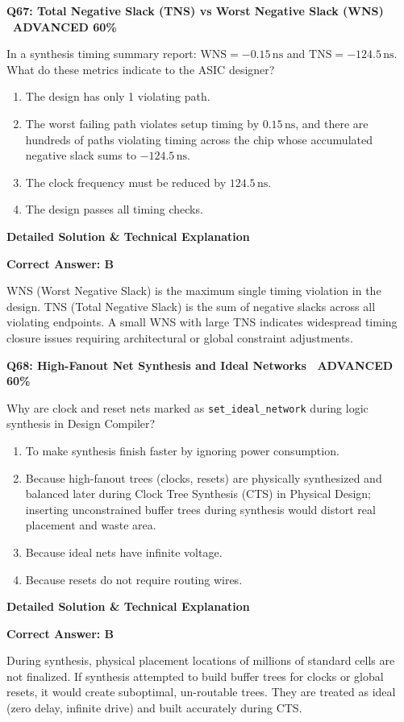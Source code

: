 \documentclass[11pt,a4paper]{article}
\newcommand{\badgeadv}{{\color{white}\colorbox{advred}{\bfseries\sffamily\tiny\ ADVANCED 60\%\ }}}
\newenvironment{qbox}[2]{%
  \begin{mdframed}[style=qstyle]%
  {\bfseries\sffamily\color{primaryblue}#1 \hfill #2}\par\vspace{2pt}%
}{%
  \end{mdframed}%
}
\newenvironment{ansbox}{%
  \begin{mdframed}[style=ansstyle]%
  {\bfseries\sffamily\color{ansgreen}\small Detailed Solution \& Technical Explanation}\par\vspace{2pt}\small%
}{%
  \end{mdframed}%
}
\begin{document}
\begin{qbox}{Q67: Total Negative Slack (TNS) vs Worst Negative Slack (WNS)}{\badgeadv}
In a synthesis timing summary report: $\text{WNS} = -0.15\,\text{ns}$ and $\text{TNS} = -124.5\,\text{ns}$. What do these metrics indicate to the ASIC designer?
\begin{enumerate}[label=\textbf{\Alph*.}]
  \item The design has only 1 violating path.
  \item The worst failing path violates setup timing by $0.15\,\text{ns}$, and there are hundreds of paths violating timing across the chip whose accumulated negative slack sums to $-124.5\,\text{ns}$.
  \item The clock frequency must be reduced by $124.5\,\text{ns}$.
  \item The design passes all timing checks.
\end{enumerate}
\end{qbox}
\begin{ansbox}
\textbf{Correct Answer: B}

WNS (Worst Negative Slack) is the maximum single timing violation in the design. TNS (Total Negative Slack) is the sum of negative slacks across all violating endpoints. A small WNS with large TNS indicates widespread timing closure issues requiring architectural or global constraint adjustments.
\end{ansbox}

\begin{qbox}{Q68: High-Fanout Net Synthesis and Ideal Networks}{\badgeadv}
Why are clock and reset nets marked as \texttt{set\_ideal\_network} during logic synthesis in Design Compiler?
\begin{enumerate}[label=\textbf{\Alph*.}]
  \item To make synthesis finish faster by ignoring power consumption.
  \item Because high-fanout trees (clocks, resets) are physically synthesized and balanced later during Clock Tree Synthesis (CTS) in Physical Design; inserting unconstrained buffer trees during synthesis would distort real placement and waste area.
  \item Because ideal nets have infinite voltage.
  \item Because resets do not require routing wires.
\end{enumerate}
\end{qbox}
\begin{ansbox}
\textbf{Correct Answer: B}

During synthesis, physical placement locations of millions of standard cells are not finalized. If synthesis attempted to build buffer trees for clocks or global resets, it would create suboptimal, un-routable trees. They are treated as ideal (zero delay, infinite drive) and built accurately during CTS.
\end{ansbox}
\end{document}
